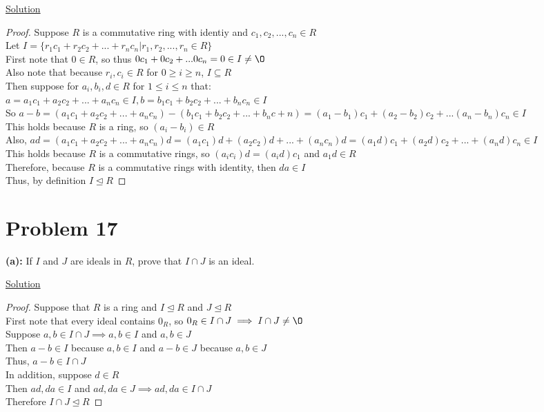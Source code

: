 \documentclass{article} %
\begin{document}
\underline{Solution}
\begin{addmargin}[1em]{0em}
\begin{proof}
Suppose $R$ is a commutative ring with identiy and $c_1,c_2,...,c_n \in R$
\\Let $I = \{r_1c_1 + r_2c_2 + ... + r_nc_n|r_1,r_2,...,r_n \in R\}$
\\First note that $0 \in R$, so thus $0c_1 + 0c_2 + ... 0c_n = 0 \in I \neq \O$
\\Also note that because $r_i,c_i \in R$ for $0 \geq i \geq n$, $I \subseteq R$
\\Then suppose for $a_i,b_i,d \in R$ for $ 1 \leq i \leq n$ that:
\\ $a = a_1c_1 + a_2c_2 + ... + a_nc_n \in I, b = b_1c_1 + b_2c_2 + ... + b_nc_n \in I$
\\So $a - b = (a_1c_1 + a_2c_2 + ... + a_nc_n) - (b_1c_1 + b_2c_2 + ... + b_nc+n) = (a_1 - b_1)c_1 + (a_2 - b_2)c_2 + ... (a_n - b_n)c_n \in I$
\\This holds because $R$ is a ring, so $(a_i - b_i) \in R$
\\Also, $ad = (a_1c_1 + a_2c_2 + ... + a_nc_n)d = (a_1c_1)d + (a_2c_2)d + ... + (a_nc_n)d = (a_1d)c_1 + (a_2d)c_2 + ... + (a_nd)c_n \in I$
\\This holds because $R$ is a commutative rings, so $(a_ic_i)d = (a_id)c_1$ and $a_1d \in R$
\\Therefore, because $R$ is a commutative rings with identity, then $da \in I$
\\Thus, by definition $I \unlhd R$
\end{proof}
\end{addmargin}

\newpage

\section*{Problem 17}


\textbf{(a): }If $I$ and $J$ are ideals in $R$, prove that $I \cap J$ is an ideal.
\\
\begin{addmargin}[1em]{0em}
\underline{Solution}
\begin{addmargin}[1em]{0em}
\begin{proof}
Suppose that $R$ is a ring and $I \unlhd R$ and $J \unlhd R$
\\First note that every ideal contains $0_R$, so $0_R \in I \cap J \implies I \cap J \neq \O$
\\Suppose $a, b \in I \cap J \implies a,b \in I$ and $a,b \in J$
\\Then $a - b \in I$ because $a, b \in I$ and $a-b \in J$ because $a,b \in J$
\\Thus, $a-b \in I \cap J$
\\In addition, suppose $d \in R$
\\Then $ad,da \in I$ and $ad,da \in J \implies ad,da \in I \cap J$
\\Therefore $I \cap J \unlhd R$
\end{proof}
\end{addmargin}
\end{addmargin}
\end{document}
